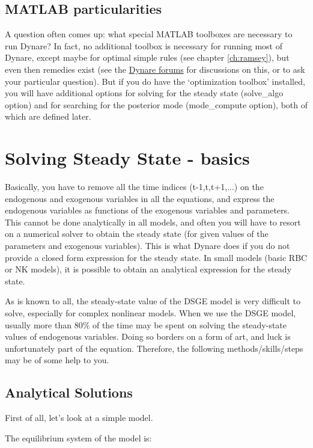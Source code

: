 \documentclass[10pt,math=newtx,citestyle=gb7714-2015,bibstyle=gb7714-2015]{elegantbook}
\begin{document}
	\section{MATLAB particularities}
	
	A question often comes up: what special MATLAB toolboxes are necessary to run Dynare? In fact, no additional toolbox is necessary for running most of Dynare, except maybe for optimal simple rules (see chapter \ref{ch:ramsey}), but even then remedies exist (see the \href{http://www.dynare.org/phpBB3}{Dynare forums} for discussions on this, or to ask your particular question). But if you do have the `optimization toolbox' installed, you will have additional options for solving for the steady state (solve\_algo option) and for searching for the posterior mode (mode\_compute option), both of which are defined later. 
	
	\chapter{Solving Steady State - basics}
	Basically, you have to remove all the time indices (t-1,t,t+1,...) on the endogenous and exogenous variables in all the equations, and express the endogenous variables as functions of the exogenous variables and parameters. This cannot be done analytically in all models, and often you will have to resort on a numerical solver to obtain the steady state (for given values of the parameters and exogenous variables). This is what Dynare does if you do not provide a closed form expression for the steady state. In small models (basic RBC or NK models), it is possible to obtain an analytical expression for the steady state.
	
	As is known to all, the steady-state value of the DSGE model is very difficult to solve, especially for complex nonlinear models. When we use the DSGE model, usually more than $80\%$ of the time may be spent on solving the steady-state values of endogenous variables. Doing so borders on a form of art, and luck is unfortunately part of the equation. Therefore, the following methods/skills/steps may be of some help to you.
	
	
	\section{Analytical Solutions} \label{sec:distcn}
	
	First of all, let's look at a simple model.

	The equilibrium system of the model is:
	
\end{document}

